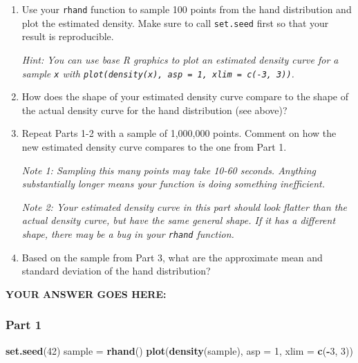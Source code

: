 \documentclass[
]{article}
\newenvironment{Shaded}{\begin{snugshade}}{\end{snugshade}}
\newcommand{\DataTypeTok}[1]{\textcolor[rgb]{0.13,0.29,0.53}{#1}}
\newcommand{\DecValTok}[1]{\textcolor[rgb]{0.00,0.00,0.81}{#1}}
\newcommand{\KeywordTok}[1]{\textcolor[rgb]{0.13,0.29,0.53}{\textbf{#1}}}
\newcommand{\NormalTok}[1]{#1}
\newcommand{\OperatorTok}[1]{\textcolor[rgb]{0.81,0.36,0.00}{\textbf{#1}}}
\newcommand{\StringTok}[1]{\textcolor[rgb]{0.31,0.60,0.02}{#1}}
\begin{document}
\begin{enumerate}
\def\labelenumi{\arabic{enumi}.}
\item
  Use your \texttt{rhand} function to sample 100 points from the hand
  distribution and plot the estimated density. Make sure to call
  \texttt{set.seed} first so that your result is reproducible.

  \emph{Hint: You can use base R graphics to plot an estimated density
  curve for a sample \texttt{x} with
  \texttt{plot(density(x),\ asp\ =\ 1,\ xlim\ =\ c(-3,\ 3))}.}
\item
  How does the shape of your estimated density curve compare to the
  shape of the actual density curve for the hand distribution (see
  above)?
\item
  Repeat Parts 1-2 with a sample of 1,000,000 points. Comment on how the
  new estimated density curve compares to the one from Part 1.

  \emph{Note 1: Sampling this many points may take 10-60 seconds.
  Anything substantially longer means your function is doing something
  inefficient.}

  \emph{Note 2: Your estimated density curve in this part should look
  flatter than the actual density curve, but have the same general
  shape. If it has a different shape, there may be a bug in your
  \texttt{rhand} function.}
\item
  Based on the sample from Part 3, what are the approximate mean and
  standard deviation of the hand distribution?
\end{enumerate}

\textbf{YOUR ANSWER GOES HERE:}

\hypertarget{part-1}{%
\subsubsection{Part 1}\label{part-1}}

\begin{Shaded}
\begin{Highlighting}[]
\KeywordTok{set.seed}\NormalTok{(}\DecValTok{42}\NormalTok{)}
\NormalTok{sample =}\StringTok{ }\KeywordTok{rhand}\NormalTok{()}
\KeywordTok{plot}\NormalTok{(}\KeywordTok{density}\NormalTok{(sample), }\DataTypeTok{asp =} \DecValTok{1}\NormalTok{, }\DataTypeTok{xlim =} \KeywordTok{c}\NormalTok{(}\OperatorTok{{-}}\DecValTok{3}\NormalTok{, }\DecValTok{3}\NormalTok{))}
\end{Highlighting}
\end{Shaded}
\end{document}
